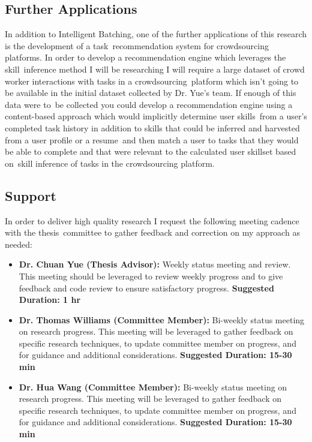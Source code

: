 \documentclass[letterpaper,12pt]{article}
\begin{document}
\subsection{Further Applications}
In addition to Intelligent Batching, one of the further applications of this research is the development of a task\
recommendation system for crowdsourcing platforms. In order to develop a recommendation engine which leverages the skill\
inference method I will be researching I will require a large dataset of crowd worker interactions with tasks in a crowdsourcing\
platform which isn't going to be available in the initial dataset collected by Dr. Yue's team. If enough of this data were to\
be collected you could develop a recommendation engine using a content-based approach which would implicitly determine user skills\
from a user's completed task history in addition to skills that could be inferred and harvested from a user profile or a resume\
and then match a user to tasks that they would be able to complete and that were relevant to the calculated user skillset based on\
skill inference of tasks in the crowdsourcing platform.
\subsection{Support}
In order to deliver high quality research I request the following meeting cadence with the thesis\
committee to gather feedback and correction on my approach as needed:
\begin{itemize}
	\item \textbf{Dr. Chuan Yue (Thesis Advisor):} Weekly status meeting and review. This meeting should be leveraged to review weekly progress and to give feedback and code review to ensure satisfactory progress. \textbf{Suggested Duration: 1 hr}
	\item \textbf{Dr. Thomas Williams (Committee Member):} Bi-weekly status meeting on research progress. This meeting will be leveraged to gather feedback on specific research techniques, to update committee member on progress, and for guidance and additional considerations. \textbf{Suggested Duration: 15-30 min}
	\item \textbf{Dr. Hua Wang (Committee Member):} Bi-weekly status meeting on research progress. This meeting will be leveraged to gather feedback on specific research techniques, to update committee member on progress, and for guidance and additional considerations. \textbf{Suggested Duration: 15-30 min}
\end{itemize}
\end{document}
